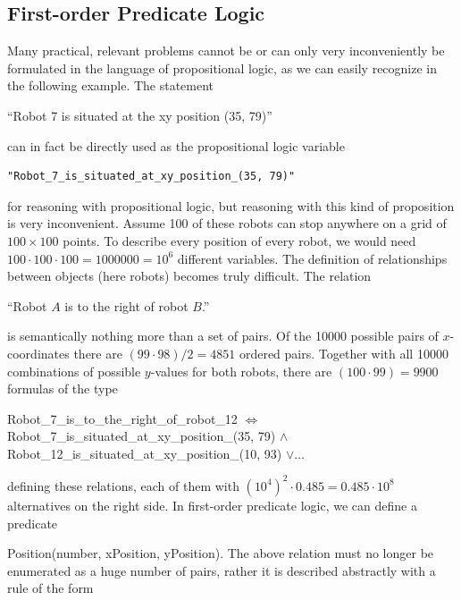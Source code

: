 \documentclass[10pt]{book}
\begin{document}
\subsection{First-order Predicate Logic}
Many practical, relevant problems cannot be or can only very inconveniently be formulated in the language of propositional logic, as we can easily recognize in the following example. The statement
\begin{displayquote}
``Robot 7 is situated at the xy position (35, 79)''
\end{displayquote}

can in fact be directly used as the propositional logic variable

\begin{verbatim}
"Robot_7_is_situated_at_xy_position_(35, 79)"
\end{verbatim}

for reasoning with propositional logic, but reasoning with this kind of proposition is very inconvenient. Assume 100 of these robots can stop anywhere on a grid of $100 \times 100$ points. To describe every position of every robot, we would need $100 \cdot 100 \cdot 100=1000000=10^{6}$ different variables. The definition of relationships between objects (here robots) becomes truly difficult. The relation

\begin{displayquote}
``Robot $A$ is to the right of robot $B$.''
\end{displayquote}

is semantically nothing more than a set of pairs. Of the 10000 possible pairs of $x$-coordinates there are $(99 \cdot 98) / 2=4851$ ordered pairs. Together with all 10000 combinations of possible $y$-values for both robots, there are $(100 \cdot 99)=9900$ formulas of the type

\begin{displayquote}
Robot\_7\_is\_to\_the\_right\_of\_robot\_12 $\Leftrightarrow$ Robot\_7\_is\_situated\_at\_xy\_position\_(35, 79) $\wedge$ Robot\_12\_is\_situated\_at\_xy\_position\_(10, 93) $\vee \ldots$
\end{displayquote}

defining these relations, each of them with $\left(10^{4}\right)^{2} \cdot 0.485=0.485 \cdot 10^{8}$ alternatives on the right side. In first-order predicate logic, we can define a predicate

Position(number, xPosition, yPosition). The above relation must no longer be enumerated as a huge number of pairs, rather it is described abstractly with a rule of the form
\end{document}
